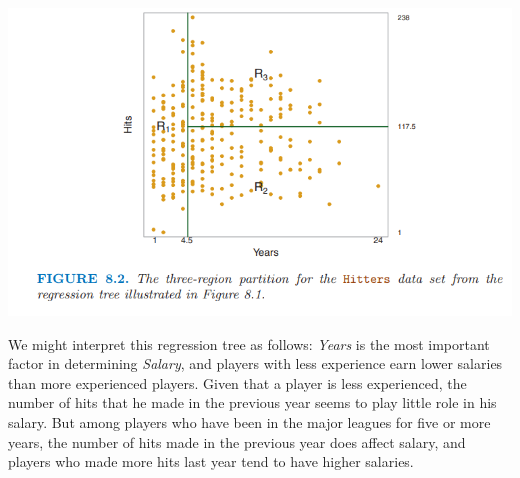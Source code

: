 \begin{center}
    \includegraphics[scale=0.7]{images/reg-tree-2.png}
\end{center}
We might interpret this regression tree as follows: \textit{Years} is the most important factor in determining \textit{Salary}, and players with less experience earn lower salaries than more experienced players. Given that a player is less experienced, the number of hits that he made in the previous year seems to play little role in his salary. But among players who have been in the major leagues for five or more years, the number of hits made in the previous year does affect salary, and players who made more hits last year tend to have higher salaries.

